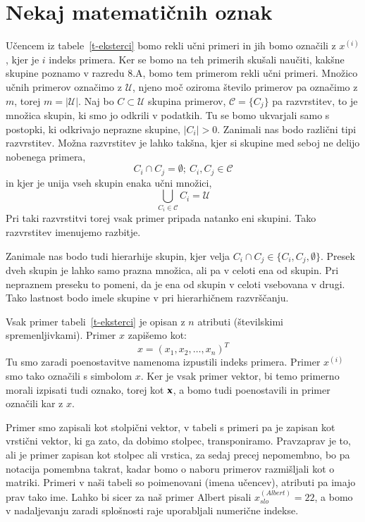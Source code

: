 \section{Nekaj matematičnih oznak}

Učencem iz tabele~\ref{t-eksterci} bomo rekli učni primeri in jih bomo
označili z $x^{(i)}$, kjer je $i$ indeks primera. Ker se bomo na teh
primerih skušali naučiti, kakšne skupine poznamo v razredu 8.A, bomo
tem primerom rekli učni primeri. Množico učnih primerov označimo z
$\mathcal{U}$, njeno moč oziroma število primerov pa označimo z $m$,
torej $m=|\mathcal{U}|$. Naj bo $C\subset \mathcal{U}$ skupina
primerov, $\mathcal{C}=\{C_j\}$ pa razvrstitev, to je množica skupin,
ki smo jo odkrili v podatkih. Tu se bomo ukvarjali samo s postopki, ki
odkrivajo neprazne skupine, $|C_i|>0$. Zanimali nas bodo različni tipi
razvrstitev. Možna razvrstitev je lahko takšna, kjer si skupine med
seboj ne delijo nobenega primera,
%
$$C_i\cap C_j=\emptyset;\ C_i,C_j\in\mathcal{C}$$
%
in kjer je unija vseh skupin enaka učni množici,
%
$$ \displaystyle\bigcup_{C_i\in\mathcal{C}}C_i=\mathcal{U} $$ 
%
Pri taki razvrstitvi torej vsak primer pripada natanko eni
skupini. Tako razvrstitev imenujemo razbitje.

Zanimale nas bodo tudi hierarhije skupin, kjer velja $C_i\cap
C_j\in\{C_i,C_j,\emptyset\}$.  Presek dveh skupin je lahko samo prazna
množica, ali pa v celoti ena od skupin. Pri nepraznem preseku to
pomeni, da je ena od skupin v celoti vsebovana v drugi. Tako lastnost
bodo imele skupine v pri hierarhičnem razvrščanju.

Vsak primer tabeli~\ref{t-eksterci} je opisan z $n$ atributi
(številskimi spremenljivkami). Primer $x$ zapišemo kot:
%
$$ x=(x_1,x_2, \ldots, x_n)^T $$ 
%
Tu smo zaradi poenostavitve namenoma izpustili indeks primera. Primer
$x^{(i)}$ smo tako označili s simbolom $x$. Ker je vsak primer vektor,
bi temo primerno morali izpisati tudi oznako, torej kot $\bf x$, a
bomo tudi poenostavili in primer označili kar z $x$.

Primer smo zapisali kot stolpični vektor, v tabeli s primeri pa je
zapisan kot vrstični vektor, ki ga zato, da dobimo stolpec,
transponiramo. Pravzaprav je to, ali je primer zapisan kot stolpec ali
vrstica, za sedaj precej nepomembno, bo pa notacija pomembna takrat,
kadar bomo o naboru primerov razmišljali kot o matriki. Primeri v naši
tabeli so poimenovani (imena učencev), atributi pa imajo prav tako
ime. Lahko bi sicer za naš primer Albert pisali
$x^{(Albert)}_{slo}=22$, a bomo v nadaljevanju zaradi splošnosti raje
uporabljali numerične indekse.

